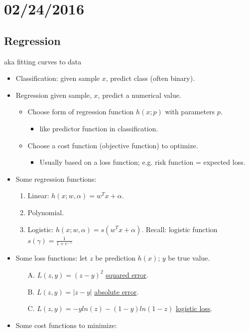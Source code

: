 \documentclass[10pt]{article}
\begin{document}
	\section*{02/24/2016}
	\subsection*{Regression} aka fitting curves to data
	\begin{itemize}
		\item Classification: given sample $x$, predict class (often binary).
		\item Regression given sample, $x$, predict a numerical value.
		\begin{itemize}
			\item Choose form of regression function $h(x;p)$ with parameters $p$.
			\begin{itemize}
				\item like predictor function in classification.
			\end{itemize}
			\item Choose a cost function (objective function) to optimize.
			\begin{itemize}
				\item Usually based on a loss function; e.g. risk function = expected loss.
			\end{itemize}
		\end{itemize}
		\item Some regression functions:
			\begin{enumerate}
				\item Linear: $h(x; w, \alpha) = w^{T}x + \alpha$.
				\item Polynomial.
				\item Logistic: $h(x; w, \alpha) = s(w^{T}x + \alpha)$. Recall: logistic function $s(\gamma) = \frac{1}{1 + e^{-\gamma}}$
			\end{enumerate}
		\item Some loss functions: let $z$ be prediction $h(x)$; $y$ be true value.
			\begin{enumerate}
				\item[A.] $L(z, y) = (z-y)^{2}$ \underline{squared error}.
				\item[B.] $L(z, y) = |z-y|$ \underline{absolute error}.
				\item[C.] $L(z, y) = -yln(z)-(1-y)ln(1-z)$ \underline{logistic loss}.
			\end{enumerate}
		\item Some cost functions to minimize:

\end{itemize}
\end{document}
